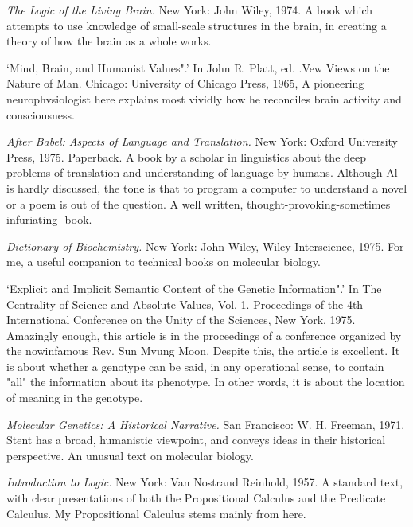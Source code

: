  {\sl The Logic of the Living Brain.} New York: John Wiley, 1974. A book which attempts to use knowledge of small-scale structures in the brain, in creating a theory of how the brain as a whole works.

 `Mind, Brain, and Humanist Values".' In John R. Platt, ed. .Vew Views on the Nature of Man. Chicago: University of Chicago Press, 1965, A pioneering neurophvsiologist here explains most vividly how he reconciles brain activity and consciousness.

 {\sl After Babel: Aspects of Language and Translation.} \llap{*\enspace}New York: Oxford University Press, 1975. Paperback. A book by a scholar in linguistics about the deep problems of translation and understanding of language by humans. Although Al is hardly discussed, the tone is that to program a computer to understand a novel or a poem is out of the question. A well written, thought-provoking-sometimes infuriating- book.

 {\sl Dictionary of Biochemistry.} New York: John Wiley, Wiley-Interscience, 1975. For me, a useful companion to technical books on molecular biology.

 `Explicit and Implicit Semantic Content of the Genetic Information".' \llap{**\enspace}In The Centrality of Science and Absolute Values, Vol. 1. Proceedings of the 4th International Conference on the Unity of the Sciences, New York, 1975. Amazingly enough, this article is in the proceedings of a conference organized by the nowinfamous Rev. Sun Mvung Moon. Despite this, the article is excellent. It is about whether a genotype can be said, in any operational sense, to contain "all" the information about its phenotype. In other words, it is about the location of meaning in the genotype.

 {\sl Molecular Genetics: A Historical Narrative.} San Francisco: W. H. Freeman, 1971. Stent has a broad, humanistic viewpoint, and conveys ideas in their historical perspective. An unusual text on molecular biology.

 {\sl Introduction to Logic.} New York: Van Nostrand Reinhold, 1957. A standard text, with clear presentations of both the Propositional Calculus and the Predicate Calculus. My Propositional Calculus stems mainly from here.

